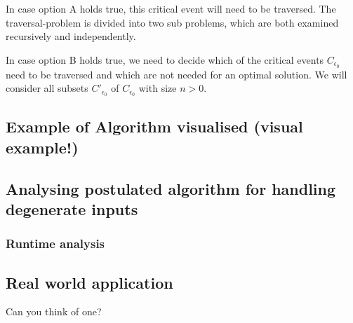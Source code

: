 In case option A holds true, this critical event will need to be traversed. The traversal-problem is divided into two sub problems, which are both examined recursively and independently.

In case option B holds true, we need to decide which of the critical events $C_{\epsilon_0}$ need to be traversed and which are not needed for an optimal solution. We will consider all subsets $C'_{\epsilon_0}$ of $C_{\epsilon_0}$ with size $n>0$.


\subsection{Example of Algorithm visualised (visual example!)}

\subsection{Analysing postulated algorithm for handling degenerate inputs}
\subsubsection{Runtime analysis}
\subsection{Real world application}
	Can you think of one?
	
	
	
	